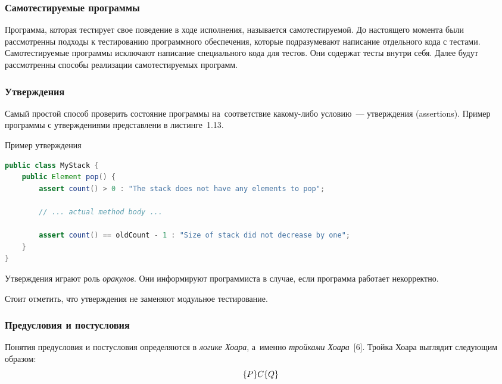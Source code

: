\subsubsection{Самотестируемые программы}

Программа, которая тестирует свое поведение в ходе исполнения, называется самотестируемой. До настоящего момента были рассмотренны подходы к тестированию программного обеспечения, которые подразумевают написание отдельного кода с тестами. Самотестируемые программы исключают написание специального кода для тестов. Они содержат тесты внутри себя.  Далее будут рассмотренны способы реализации самотестируемых программ.

\subsubsection{Утверждения}

Самый простой способ проверить состояние программы на~соответствие какому-либо условию~--- утверждения (assertions). Пример программы с утверждениями представлени в листинге~1.13.

\begin{ListingEnv}[!h]%
	\captiondelim{ } %
	\caption{Пример утверждения}
	\begin{lstlisting}[language={Java}]
public class MyStack {
	public Element pop() {
		assert count() > 0 : "The stack does not have any elements to pop";
		
		// ... actual method body ...
		
		assert count() == oldCount - 1 : "Size of stack did not decrease by one";
	}
}
	\end{lstlisting}
\end{ListingEnv}%


Утверждения играют роль \textit{оракулов}. Они информируют программиста в случае, если программа работает некорректно. 

Стоит отметить, что утверждения не заменяют модульное тестирование. 


\subsubsection{Предусловия и постусловия}	

Понятия предусловия и постусловия определяются в \textit{логике Хоара}, а~именно \textit{тройками Хоара}~[6]. Тройка Хоара выглядит следующим образом: \[\{P\} \space C \space \{Q\}\]

